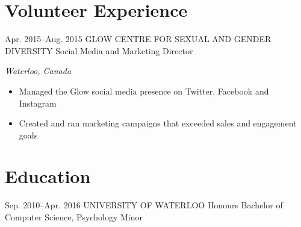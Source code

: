 \documentclass[]{friggeri-cv}
\begin{document}
\vspace{-2.5\parskip}
\section{Volunteer Experience}


\begin{sectionlist}
	
	\entry
	{Apr. 2015--Aug. 2015}
	{GLOW CENTRE FOR SEXUAL AND GENDER DIVERSITY}
	{Social Media and Marketing Director}
	{\emph{Waterloo, Canada} \\
		\begin{itemize}
			\item Managed the Glow social media presence on Twitter, Facebook and Instagram
			\item Created and ran marketing campaigns that exceeded sales and engagement goals  
		\end{itemize}
	}

\end{sectionlist}

\vspace{-2.5\parskip}
\section{Education}

\begin{sectionlist}
		
	\education
	{Sep. 2010--Apr. 2016}
	{UNIVERSITY OF WATERLOO}
	{Honours Bachelor of Computer Science, Psychology Minor}
	
\end{sectionlist}
\end{document}
